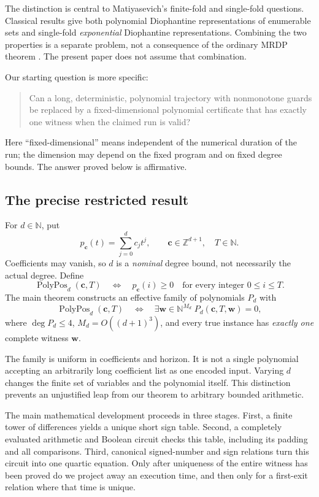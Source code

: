 \documentclass[11pt,a4paper]{article}
\theoremstyle{definition}
\theoremstyle{remark}
\newcommand{\N}{\mathbb N}
\newcommand{\Z}{\mathbb Z}
\newcommand{\PolyPos}{\operatorname{PolyPos}}
\begin{document}
The distinction is central to Matiyasevich's finite-fold and single-fold
questions. Classical results give both polynomial Diophantine
representations of enumerable sets and single-fold \emph{exponential}
Diophantine representations. Combining the two properties is a separate
problem, not a consequence of the ordinary MRDP theorem
\cite{mat2010}. The present paper does not assume that combination.

Our starting question is more specific:
\begin{quote}
Can a long, deterministic, polynomial trajectory with nonmonotone guards be
replaced by a fixed-dimensional polynomial certificate that has exactly one
witness when the claimed run is valid?
\end{quote}
Here ``fixed-dimensional'' means independent of the numerical duration of
the run; the dimension may depend on the fixed program and on fixed degree
bounds. The answer proved below is affirmative.

\subsection{The precise restricted result}
For $d\in\N$, put
\[
 p_{\boldsymbol c}(t)=\sum_{j=0}^d c_jt^j,
 \qquad \boldsymbol c\in\Z^{d+1},\quad T\in\N.
\]
Coefficients may vanish, so $d$ is a \emph{nominal} degree bound, not
necessarily the actual degree. Define
\[
 \PolyPos_d(\boldsymbol c,T)
 \quad\Longleftrightarrow\quad
 p_{\boldsymbol c}(i)\geq0\quad\text{for every integer }0\leq i\leq T.
\]
The main theorem constructs an effective family of polynomials $P_d$ with
\begin{equation}
 \PolyPos_d(\boldsymbol c,T)
 \quad\Longleftrightarrow\quad
 \exists\boldsymbol w\in\N^{M_d}\;
 P_d(\boldsymbol c,T,\boldsymbol w)=0,
 \label{cdc:pt:eq:intro-main}
\end{equation}
where $\deg P_d\leq4$, $M_d=O((d+1)^3)$, and every true instance has
\emph{exactly one} complete witness $\boldsymbol w$.

The family is uniform in coefficients and horizon. It is not a single
polynomial accepting an arbitrarily long coefficient list as one encoded
input. Varying $d$ changes the finite set of variables and the polynomial
itself. This distinction prevents an unjustified leap from our theorem to
arbitrary bounded arithmetic.

The main mathematical development proceeds in three stages. First, a finite
tower of differences yields a unique short sign table. Second, a completely
evaluated arithmetic and Boolean circuit checks this table, including its
padding and all comparisons. Third, canonical signed-number and sign
relations turn this circuit into one quartic equation. Only after uniqueness
of the entire witness has been proved do we project away an execution time,
and then only for a first-exit relation where that time is unique.
\end{document}
